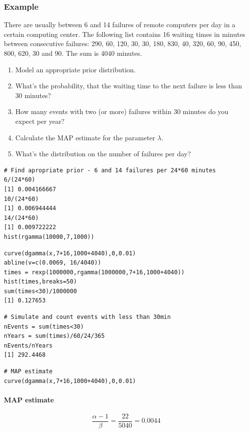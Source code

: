 \documentclass[11pt]{article}
\begin{document}
\subsubsection{Example}

There are usually between 6 and 14 failures of remote computers per day in a certain computing center. The following list contains 16 waiting times in minutes between consecutive failures: 290, 60, 120, 30, 30, 180, 830, 40, 320, 60, 90, 450, 800, 620, 30 and 90. The sum is 4040 minutes.
\begin{enumerate}
	\item Model an appropriate prior distribution.
	\item What's the probability, that the waiting time to the next failure is less than 30 minutes?
	\item How many events with two (or more) failures within 30 minutes do you expect per year?
	\item Calculate the MAP estimate for the parameter $\lambda$.
	\item What's the distribution on the number of failures per day?
\end{enumerate}

\begin{verbatim}
# Find apropriate prior - 6 and 14 failures per 24*60 minutes
6/(24*60)
[1] 0.004166667
10/(24*60)
[1] 0.006944444
14/(24*60)
[1] 0.009722222
hist(rgamma(10000,7,1000))
\end{verbatim}

\begin{verbatim}
curve(dgamma(x,7+16,1000+4040),0,0.01)
abline(v=c(0.0069, 16/4040))
times = rexp(1000000,rgamma(1000000,7+16,1000+4040))
hist(times,breaks=50)
sum(times<30)/1000000
[1] 0.127653
\end{verbatim}

\begin{verbatim}
# Simulate and count events with less than 30min
nEvents = sum(times<30)
nYears = sum(times)/60/24/365
nEvents/nYears
[1] 292.4468
\end{verbatim}

\begin{verbatim}
# MAP estimate
curve(dgamma(x,7+16,1000+4040),0,0.01)
\end{verbatim}

\paragraph{MAP estimate}
\begin{equation*}
	\frac{\alpha-1}{\beta} = \frac{22}{5040} = 0.0044
\end{equation*}
\end{document}
